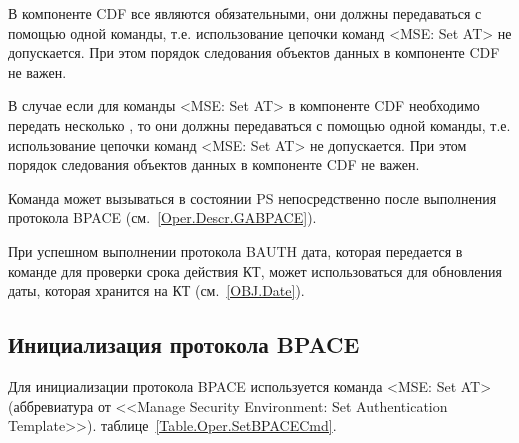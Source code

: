 В компоненте CDF все  являются обязательными, 
они должны передаваться с помощью одной команды, 
т.е. использование цепочки команд <MSE: Set AT> не допускается. 
При этом порядок следования объектов данных в компоненте CDF не важен. 

В случае если для команды <MSE: Set AT> в компоненте CDF необходимо 
передать несколько , то они должны передаваться с помощью 
одной команды, т.е. использование цепочки команд <MSE: Set AT> не 
допускается. При этом порядок следования объектов данных в компоненте CDF 
не важен. 
\fi

Команда может вызываться  в состоянии PS 
непосредственно после выполнения протокола BPACE (см.~\ref{Oper.Descr.GABPACE}).


При успешном выполнении протокола BAUTH дата, которая передается в команде 
для проверки срока действия КТ, может использоваться для обновления 
даты, которая хранится на КТ (см.~\ref{OBJ.Date}). 

\subsection{Инициализация протокола BPACE}
\label{Oper.Descr.SetBPACE}

Для инициализации протокола BPACE используется команда
<MSE: Set AT> (аббревиатура от <<Manage Security Environment: Set 
Authentication Template>>). 
 таблице~\ref{Table.Oper.SetBPACECmd}.

